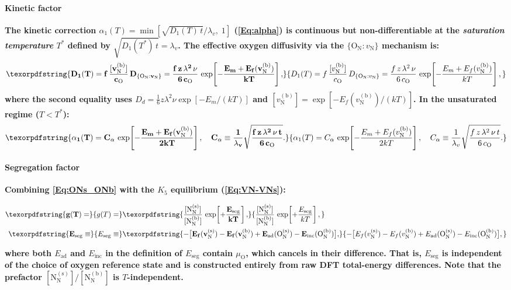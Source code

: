 \documentclass[preprint,12pt,sort&compress]{elsarticle}
\newcommand{\?}{\stackrel{?}{=}}
\providecommand{\DIFaddtex}[1]{{\bf #1}} %
\providecommand{\DIFadd}[1]{\texorpdfstring{\DIFaddtex{#1}}{#1}} %
\begin{document}
\paragraph{\DIFadd{Kinetic factor}} \DIFadd{The kinetic correction $\alpha_1(T) = \min[\sqrt{D_1(T)\,t}/\lambda_v,\; 1]$ (\cref{Eq:alpha}) is continuous but non-differentiable at the \emph{saturation temperature} $T^*$ defined by $\sqrt{D_1(T^*)\,t} = \lambda_v$. The effective oxygen diffusivity via the $\{\text{O}_\text{N} : v_\text{N}\}$ mechanism is:
}\begin{equation}
\DIFadd{D_1(T) = f\,\frac{[v_\text{N}^{(\text{b})}]}{c_\text{O}}\,D_{\{\text{O}_\text{N}:v_\text{N}\}} = \frac{f\,z\,\lambda^2\,\nu}{6\,c_\text{O}}\,\exp\!\left[-\frac{E_m + E_f(v_\text{N}^{(\text{b})})}{kT}\right],
\label{Eq:App:D1}
}\end{equation}
\DIFadd{where the second equality uses $D_d = \frac{1}{6}z\lambda^2\nu\exp[-E_m/(kT)]$ and $[v_\text{N}^{(\text{b})}] = \exp[-E_f(v_\text{N}^{(\text{b})})/(kT)]$. In the unsaturated regime ($T < T^*$):
}\begin{equation}
\DIFadd{\alpha_1(T) = C_\alpha\,\exp\!\left[-\frac{E_m + E_f(v_\text{N}^{(\text{b})})}{2kT}\right], \quad C_\alpha \equiv \frac{1}{\lambda_v}\sqrt{\frac{f\,z\,\lambda^2\,\nu\,t}{6\,c_\text{O}}}.
\label{Eq:App:alpha1Unsat}
}\end{equation}

\paragraph{\DIFadd{Segregation factor}} \DIFadd{Combining \cref{Eq:ONs_ONb} with the $K_5$ equilibrium (\cref{Eq:VN-VNs}):
}

\begin{align}
\DIFadd{g(T) = }& \DIFadd{\frac{[\text{N}_\text{N}^{(\text{s})}]}{[\text{N}_\text{N}^{(\text{b})}]}\,\exp\!\left[+\frac{E_\text{seg}}{kT}\right], }\\
\DIFadd{E_\text{seg} \equiv }& \DIFadd{-\bigl[E_f(v_\text{N}^{(\text{s})}) - E_f(v_\text{N}^{(\text{b})}) + E_\text{ad}(\text{O}_\text{N}^{(\text{s})}) - E_\text{inc}(\text{O}_\text{N}^{(\text{b})})\bigr],
\label{Eq:App:gT}
}\end{align}

\DIFadd{where both $E_\text{ad}$ and $E_\text{inc}$ in the definition of $E_\text{seg}$ contain $\mu_\text{O}$, which cancels in their difference. That is, $E_\text{seg}$ is independent of the choice of oxygen reference state and is constructed entirely from raw DFT total-energy differences. Note that the prefactor $[\text{N}_\text{N}^{(\text{s})}]/[\text{N}_\text{N}^{(\text{b})}]$ is $T$-independent.
}
\end{document}
